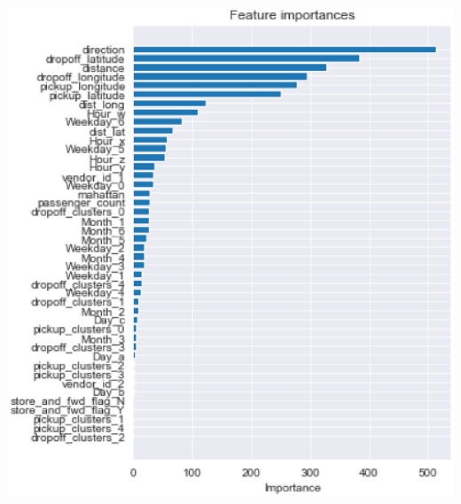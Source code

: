 \documentclass{tikzposter} %
\begin{document}
\begin{columns}
{\begin{itemize}
\begin{center}
			\includegraphics[scale=0.9]{figures/25.eps}
		\end{center}
	\end{itemize}
%	
%	
}



\end{columns}
\end{document}
